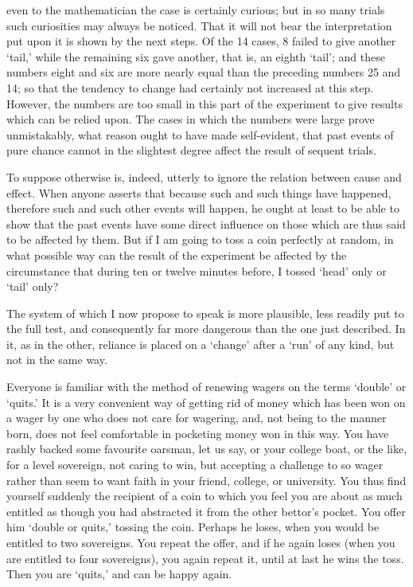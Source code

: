 \documentclass[letterpaper,12pt,oneside,openany]{memoir}
\begin{document}
even to the mathematician the case is certainly curious;
but in so many trials such curiosities may always be
noticed. That it will not bear the interpretation put
upon it is shown by the next steps. Of the 14 cases,
8 failed to give another `tail,' while the remaining six
gave another, that is, an eighth `tail'; and these
numbers eight and six are more nearly equal than the
preceding numbers 25 and 14; so that the tendency to
change had certainly not increased at this step. However,
the numbers are too small in this part of the experiment
to give results which can be relied upon.
The cases in which the numbers were large prove unmistakably,
what reason ought to have made self-evident,
that past events of pure chance cannot in the
slightest degree affect the result of sequent trials.

To suppose otherwise is, indeed, utterly to ignore
the relation between cause and effect. When anyone
asserts that because such and such things have happened,
therefore such and such other events will happen, he
ought at least to be able to show that the past events
have some direct influence on those which are thus said
to be affected by them. But if I am going to toss a
coin perfectly at random, in what possible way can the
result of the experiment be affected by the circumstance
that during ten or twelve minutes before, I tossed `head'
only or `tail' only?

The system of which I now propose to speak is more
plausible, less readily put to the full test, and consequently
far more dangerous than the one just described.
In it, as in the other, reliance is placed on a `change'
after a `run' of any kind, but not in the same way.

Everyone is familiar with the method of renewing
wagers on the terms `double' or `quits.' It is a very
convenient way of getting rid of money which has been
won on a wager by one who does not care for wagering,
and, not being to the manner born, does not feel comfortable
in pocketing money won in this way. You
have rashly backed some favourite oarsman, let us say,
or your college boat, or the like, for a level sovereign,
not caring to win, but accepting a challenge to so wager
rather than seem to want faith in your friend, college,
or university. You thus find yourself suddenly the
recipient of a coin to which you feel you are about as
much entitled as though you had abstracted it from the
other bettor's pocket. You offer him `double or quits,'
tossing the coin. Perhaps he loses, when you would be
entitled to two sovereigns. You repeat the offer, and if
he again loses (when you are entitled to four sovereigns),
you again repeat it, until at last he wins the toss. Then
you are `quits,' and can be happy again.
\end{document}
